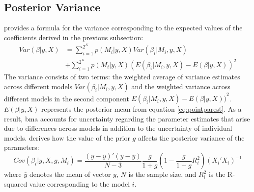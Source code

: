 \documentclass[a4paper,11pt]{article}
\begin{document}
\subsection*{Posterior Variance}
\citet{MoralBenito2012} provides a formula for the variance corresponding to the expected values of the coefficients derived in the previous subsection:
\begin{equation}\label{eq:postvar}
\begin{aligned}
Var(\beta \vert y, X) &= \sum_{i=1}^{2^{K}} p(M_{i} \vert y,X)Var(\beta_{i} \vert M_{i},y,X) \\ 
& +\sum_{i=1}^{2^{K}}p(M_{i} \vert y,X){(E(\beta_{i}\vert M_{i},y,X)-E(\beta \vert y, X))}^{2}
\end{aligned}
\end{equation}
The variance consists of two terms: the weighted average of variance estimates across different models $Var(\beta_{i} \vert M_{i},y,X)$ and the weighted variance across different models in the second component ${{E(\beta_{i}\vert  M_{i},y,X)}-{E(\beta \vert y,X))}}^{2}$. $E(\beta \vert y,X)$ represents the posterior mean from equation \ref{eq:pointparest}. As a result, \ac{bma} accounts for uncertainty regarding the parameter estimates that arise due to differences across models in addition to the uncertainty of individual models. \citet{Zeugner2011} derives how the value of the prior $g$ affects the posterior variance of the parameters:
%
\begin{equation}\label{eq:postvarZ}
Cov(\beta_{i}\vert y,X,g,M_{i}) = \frac{(y-\bar{y})'(y-\bar{y})}{N-3} \frac{g}{1+g} \left( 1- \frac{g}{1+g}R_{i}^{2} \right) (X_{i}'X_{i})^{-1}
\end{equation}
where $\bar{y}$ denotes the mean of vector $y$, $N$ is the sample size, and $R^{2}_{i}$ is the R-squared value corresponding to the model $i$.
%
\end{document}
